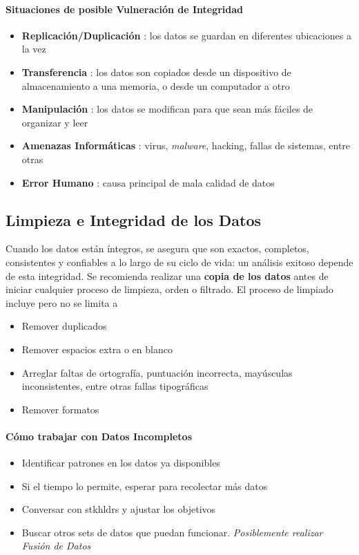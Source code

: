 \paragraph{Situaciones de posible Vulneración de Integridad}
\begin{itemize}
    \item {\textbf{Replicación/Duplicación} : los datos se guardan en diferentes ubicaciones a la vez}
    \item {\textbf{Transferencia} : los datos son copiados desde un dispositivo de almacenamiento a una memoria, o desde un computador a otro}
    \item {\textbf{Manipulación} : los datos se modifican para que sean más fáciles de organizar y leer} 
    \item {\textbf{Amenazas Informáticas} : virus, \textit{malware}, hacking, fallas de sistemas, entre otras}
    \item {\textbf{Error Humano} : causa principal de mala calidad de datos}
\end{itemize}

\subsection{Limpieza e Integridad de los Datos}
Cuando los datos están íntegros, se asegura que son exactos, completos, consistentes y confiables a lo largo de su ciclo de vida: un análisis exitoso depende de esta integridad. Se recomienda realizar una \textbf{copia de los datos} antes de iniciar cualquier proceso de limpieza, orden o filtrado. El proceso de limpiado incluye pero no se limita a 
\begin{itemize}
    \item {Remover duplicados}
    \item {Remover espacios extra o en blanco}
    \item {Arreglar faltas de ortografía, puntuación incorrecta, mayúsculas inconsistentes, entre otras fallas tipográficas}
    \item {Remover formatos}
\end{itemize}
\paragraph{Cómo trabajar con Datos Incompletos}
\begin{itemize}
    \item {Identificar patrones en los datos ya disponibles}
    \item {Si el tiempo lo permite, esperar para recolectar más datos}
    \item {Conversar con \gls{stkhldrs} y ajustar los objetivos}
    \item {Buscar otros sets de datos que puedan funcionar. \textit{Posiblemente realizar Fusión de Datos}}
\end{itemize}

